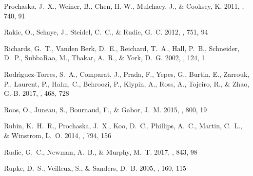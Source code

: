 \documentclass[iop]{emulateapj}
\begin{document}
\begin{thebibliography}{61}
{Prochaska}, J.~X., {Weiner}, B., {Chen}, H.-W., {Mulchaey}, J., \& {Cooksey},
  K. 2011, \apj, 740, 91

{Rakic}, O., {Schaye}, J., {Steidel}, C.~C., \& {Rudie}, G.~C. 2012, \apj, 751,
  94

{Richards}, G.~T., {Vanden Berk}, D.~E., {Reichard}, T.~A., {Hall}, P.~B.,
  {Schneider}, D.~P., {SubbaRao}, M., {Thakar}, A.~R., \& {York}, D.~G. 2002,
  \aj, 124, 1

{Rodr{\'{\i}}guez-Torres}, S.~A., {Comparat}, J., {Prada}, F., {Yepes}, G.,
  {Burtin}, E., {Zarrouk}, P., {Laurent}, P., {Hahn}, C., {Behroozi}, P.,
  {Klypin}, A., {Ross}, A., {Tojeiro}, R., \& {Zhao}, G.-B. 2017, \mnras, 468,
  728

{Roos}, O., {Juneau}, S., {Bournaud}, F., \& {Gabor}, J.~M. 2015, \apj, 800, 19

{Rubin}, K.~H.~R., {Prochaska}, J.~X., {Koo}, D.~C., {Phillips}, A.~C.,
  {Martin}, C.~L., \& {Winstrom}, L.~O. 2014, \apj, 794, 156

{Rudie}, G.~C., {Newman}, A.~B., \& {Murphy}, M.~T. 2017, \apj, 843, 98

{Rupke}, D.~S., {Veilleux}, S., \& {Sanders}, D.~B. 2005, \apjs, 160, 115


\end{thebibliography}
\end{document}
